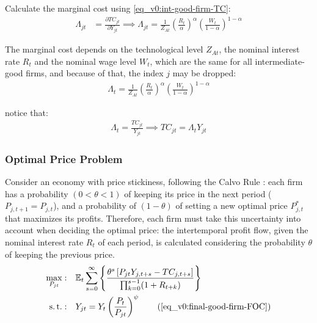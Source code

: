 \documentclass[../thesis.tex]{subfiles}
\begin{document}
	
	Calculate the marginal cost using \ref{eq_v0:int-good-firm-TC}: 
	\begin{align}
		\label{eq_v0:int-good-firm-MC}
		\Lambda_{jt} & = \frac{\partial TC_{jt}}{\partial Y_{jt}}
		\implies 
		\Lambda_{jt} = \frac{1}{Z_{At}} \left( \frac{R_t}{\alpha} \right)^{\alpha} \left( \frac{W_t}{1-\alpha} \right)^{1-\alpha}
	\end{align}
	
	The marginal cost depends on the technological level $Z_{At}$, the nominal interest rate $R_t$ and the nominal wage level $W_t$, which are the same for all intermediate-good firms, and because of that, the index $j$ may be dropped:
	\begin{align}
		\label{eq_v0:int-good-firm-MC-2}
		\Lambda_t = \frac{1}{Z_{At}} \left( \frac{R_t}{\alpha} \right)^{\alpha} \left( \frac{W_t}{1-\alpha} \right)^{1-\alpha}
	\end{align}
	
	notice that:
	\begin{align}
		\label{eq_v0:int-good-firm-TC-MC}
		\Lambda_t = \frac{TC_{jt}}{Y_{jt}} \implies 
		TC_{jt} = \Lambda_t Y_{jt}
	\end{align}
	
	
	\subsubsection*{Optimal Price Problem}
	
	Consider an economy with price stickiness, following the Calvo Rule \cite{calvo_staggered_1983}: each firm has a probability $(0 < \theta < 1)$ of keeping its price in the next period ($P_{j,t+1} = P_{j,t}$), and a probability of $(1 - \theta)$ of setting a new optimal price $P_{j,t}^\ast$ that maximizes its profits. Therefore, each firm must take this uncertainty into account when deciding the optimal price: the intertemporal profit flow, given the nominal interest rate $R_t$ of each period, is calculated considering the probability $\theta$ of keeping the previous price.
	\begin{align}
		\max_{P_{jt}}: & \quad \E \sum_{s=0}^{\infty} \left\{ \frac{ \theta^s \left[ P_{jt} Y_{j,t+s} - TC_{j,t+s} \right] }{\prod_{k=0}^{s-1}(1+R_{t+k})} \right\} \label{eq_v0:int-good-firm-optimal-price-problem} \\
		\st: & \quad Y_{jt} = Y_t \left( \frac{P_t}{P_{jt}} \right)^{\psi} \tag{\ref{eq_v0:final-good-firm-FOC}}
	\end{align}
	
\end{document}
